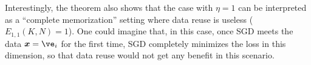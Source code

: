 Interestingly, the theorem also shows that the case with $\eta = 1$ can be interpreted as a ``complete memorization'' setting where data reuse is useless ($E_{1,1}(K,N)=1$). One could imagine that, in this case, once SGD meets the data $\vx = \ve_i$ for the first time, SGD completely minimizes the loss in this dimension, so that data reuse would not get any benefit in this scenario. 
\fi


